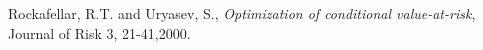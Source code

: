\documentclass[12pt]{article}
\begin{document}
\begin{thebibliography}{10} %

	



 Rockafellar, R.T. and Uryasev, S., \emph{Optimization of conditional value-at-risk},
Journal of Risk 3, 21-41,2000.








\end{thebibliography}

\newpage
 


\tableofcontents



\end{document}
